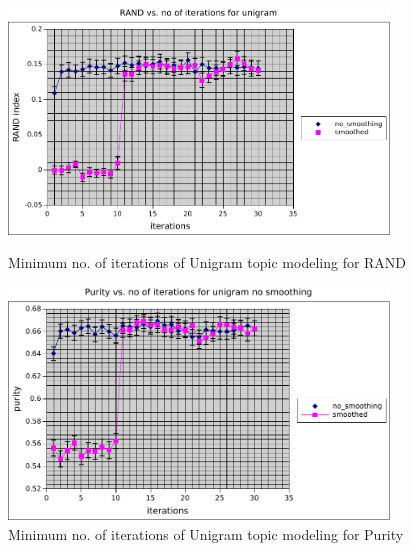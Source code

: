 \begin{figure}
    \centering
    \begin{minipage}{0.45\textwidth}
        \centering
        \includegraphics[width=0.9\textwidth]{fig/rand_k0iter_umm.pdf}
        \caption{Minimum no. of iterations of Unigram topic modeling for RAND}
    \end{minipage}\hfill
    \begin{minipage}{0.45\textwidth}
        \centering
        \includegraphics[width=0.9\textwidth]{fig/purity_k0iter_umm.pdf}
        \caption{Minimum no. of iterations of Unigram topic modeling for Purity}
    \end{minipage}
\end{figure}
